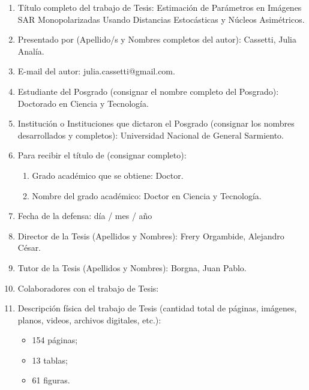 \begin{enumerate}
	\item Título completo del trabajo de Tesis: Estimación de Parámetros en Imágenes SAR Monopolarizadas Usando Distancias Estocásticas y Núcleos Asimétricos.

	\item Presentado por (Apellido/s y Nombres completos del autor): Cassetti, Julia Analía.

	\item E-mail del autor: julia.cassetti@gmail.com.

	\item Estudiante del Posgrado (consignar el nombre completo del Posgrado): Doctorado en Ciencia y Tecnología.

	\item Institución o Instituciones que dictaron el Posgrado (consignar los nombres
desarrollados y completos): Universidad Nacional de General Sarmiento.

	\item Para recibir el título de (consignar completo):

	\begin{enumerate}%
	\item Grado académico que se obtiene: Doctor.
	\item Nombre del grado académico: Doctor en Ciencia y Tecnología.
	\end{enumerate}

	\item Fecha de la defensa: día / mes / año %

	\item Director de la Tesis (Apellidos y Nombres): Frery Orgambide, Alejandro César.

	\item Tutor de la Tesis (Apellidos y Nombres): Borgna, Juan Pablo.

	\item Colaboradores con el trabajo de Tesis: 

	\item Descripción física del trabajo de Tesis (cantidad total de páginas, imágenes, planos, videos, archivos digitales, etc.):
	\begin{itemize}%
		\item 154 páginas;
		\item 13 tablas;
		\item 61 figuras.
	\end{itemize}


\end{enumerate}
